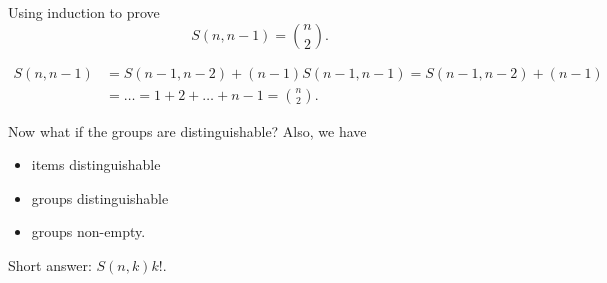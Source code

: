 \begin{eg}
    Using induction to prove 
    \[
        S(n, n - 1) = \binom{n}{2}.
    \]
\end{eg}
\begin{explanation}
    \begin{align*}
        S(n, n - 1) &= S(n - 1, n - 2) + (n - 1) S(n - 1, n - 1) = S(n - 1, n - 2) + (n - 1) \\
        &= \dots = 1 + 2 + \dots + n - 1 = \binom{n}{2}.
    \end{align*}
\end{explanation}

Now what if the groups are distinguishable? Also, we have
\begin{itemize}
    \item items distinguishable 
    \item groups distinguishable
    \item groups non-empty.
\end{itemize}

Short answer: \(S(n, k) k!\). 